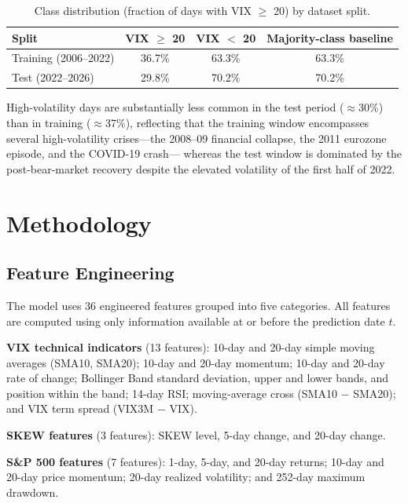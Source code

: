 \documentclass[12pt]{article}
\begin{document}
\begin{table}[H]
\centering
\caption{Class distribution (fraction of days with VIX $\geq$ 20) by dataset split.}
\label{tab:class}
\begin{tabular}{lccc}
\toprule
Split & VIX $\geq$ 20 & VIX $<$ 20 & Majority-class baseline \\
\midrule
Training (2006--2022) & 36.7\% & 63.3\% & 63.3\% \\
Test (2022--2026)     & 29.8\% & 70.2\% & 70.2\% \\
\bottomrule
\end{tabular}
\end{table}

High-volatility days are substantially less common in the test period ($\approx$30\%) than in
training ($\approx$37\%), reflecting that the training window encompasses several high-volatility
crises---the 2008--09 financial collapse, the 2011 eurozone episode, and the COVID-19 crash---
whereas the test window is dominated by the post-bear-market recovery despite the elevated
volatility of the first half of 2022.

\section{Methodology}
\label{sec:methodology}

\subsection{Feature Engineering}

The model uses 36 engineered features grouped into five categories. All features are computed
using only information available at or before the prediction date $t$.

\textbf{VIX technical indicators} (13 features): 10-day and 20-day simple moving averages
(SMA10, SMA20); 10-day and 20-day momentum; 10-day and 20-day rate of change; Bollinger Band
standard deviation, upper and lower bands, and position within the band; 14-day RSI;
moving-average cross (SMA10 $-$ SMA20); and VIX term spread (VIX3M $-$ VIX).

\textbf{SKEW features} (3 features): SKEW level, 5-day change, and 20-day change.

\textbf{S\&P 500 features} (7 features): 1-day, 5-day, and 20-day returns; 10-day and 20-day
price momentum; 20-day realized volatility; and 252-day maximum drawdown.
\end{document}

